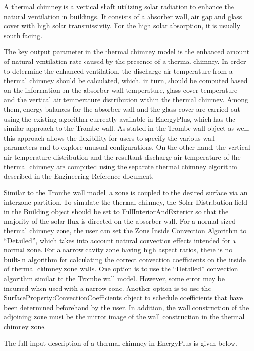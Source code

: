A thermal chimney is a vertical shaft utilizing solar radiation to enhance the natural ventilation in buildings. It consists of a absorber wall, air gap and glass cover with high solar transmissivity. For the high solar absorption, it is usually south facing.

The key output parameter in the thermal chimney model is the enhanced amount of natural ventilation rate caused by the presence of a thermal chimney. In order to determine the enhanced ventilation, the discharge air temperature from a thermal chimney should be calculated, which, in turn, should be computed based on the information on the absorber wall temperature, glass cover temperature and the vertical air temperature distribution within the thermal chimney. Among them, energy balances for the absorber wall and the glass cover are carried out using the existing algorithm currently available in EnergyPlus, which has the similar approach to the Trombe wall. As stated in the Trombe wall object as well, this approach allows the flexibility for users to specify the various wall parameters and to explore unusual configurations. On the other hand, the vertical air temperature distribution and the resultant discharge air temperature of the thermal chimney are computed using the separate thermal chimney algorithm described in the Engineering Reference document.

Similar to the Trombe wall model, a zone is coupled to the desired surface via an interzone partition. To simulate the thermal chimney, the Solar Distribution field in the Building object should be set to FullInteriorAndExterior so that the majority of the solar flux is directed on the absorber wall. For a normal sized thermal chimney zone, the user can set the Zone Inside Convection Algorithm to ``Detailed'', which takes into account natural convection effects intended for a normal zone. For a narrow cavity zone having high aspect ratios, there is no built-in algorithm for calculating the correct convection coefficients on the inside of thermal chimney zone walls. One option is to use the ``Detailed'' convection algorithm similar to the Trombe wall model. However, some error may be incurred when used with a narrow zone. Another option is to use the SurfaceProperty:ConvectionCoefficients object to schedule coefficients that have been determined beforehand by the user. In addition, the wall construction of the adjoining zone must be the mirror image of the wall construction in the thermal chimney zone.

The full input description of a thermal chimney in EnergyPlus is given below.


